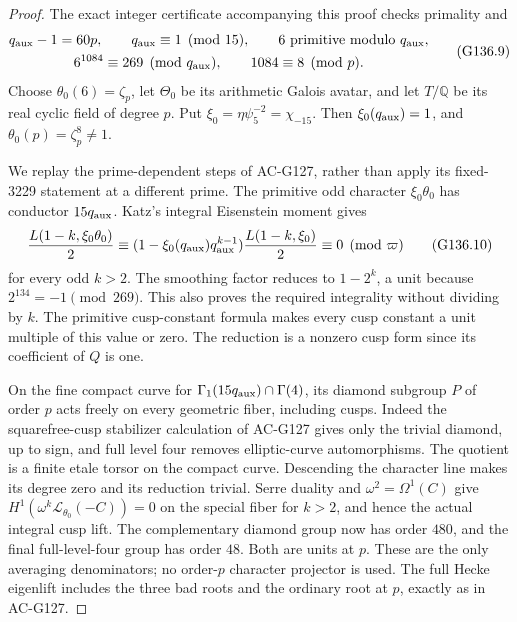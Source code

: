 \begin{proof}
The exact integer certificate accompanying this proof checks
primality and
\[
 \begin{gathered}
 q_{\rm aux}-1=60p,\qquad q_{\rm aux}\equiv1\pmod{15},\qquad
 6\text{ primitive modulo }q_{\rm aux},\\
 6^{1084}\equiv269\pmod{q_{\rm aux}},\qquad1084\equiv8\pmod p.
 \end{gathered}
 \tag{G136.9}
\]
Choose \(\theta_0(6)=\zeta_p\), let \(\Theta_0\) be its
arithmetic Galois avatar, and let \(T/\mathbb Q\) be its real
cyclic field of degree \(p\).  Put \(\xi_0=\eta\psi_5^{-2}
=\chi_{-15}\).  Then \(\xi_0(q_{\rm aux})=1\), and
\(\theta_0(p)=\zeta_p^8\ne1\).

We replay the prime-dependent steps of AC-G127, rather than
apply its fixed-3229 statement at a different prime.
The primitive odd character \(\xi_0\theta_0\) has conductor
\(15q_{\rm aux}\).  Katz's integral Eisenstein moment gives
\[
 \frac{L(1-k,\xi_0\theta_0)}2
 \equiv(1-\xi_0(q_{\rm aux})q_{\rm aux}^{k-1})
             \frac{L(1-k,\xi_0)}2\equiv0\pmod\varpi
 \tag{G136.10}
\]
for every odd \(k>2\).  The smoothing factor reduces to
\(1-2^k\), a unit because \(2^{134}=-1\pmod{269}\).
This also proves the required integrality without dividing by
\(k\).  The primitive cusp-constant formula makes every cusp
constant a unit multiple of this value or zero.  The reduction
is a nonzero cusp form since its coefficient of \(Q\) is one.

On the fine compact curve for
\(\Gamma_1(15q_{\rm aux})\cap\Gamma(4)\), its diamond
subgroup \(P\) of order \(p\) acts freely on every geometric
fiber, including cusps.  Indeed the squarefree-cusp stabilizer
calculation of AC-G127 gives only the trivial diamond, up to
sign, and full level four removes elliptic-curve automorphisms.
The quotient is a finite etale torsor on the compact curve.
Descending the character line makes its degree zero and its
reduction trivial.  Serre duality and
\(\omega^2=\Omega^1(C)\) give
\(H^1(\omega^k\mathcal L_{\theta_0}(-C))=0\) on the
special fiber for \(k>2\), and hence the actual integral cusp
lift.  The complementary diamond group now has order \(480\),
and the final full-level-four group has order \(48\).
Both are units at \(p\).  These are the only averaging
denominators; no order-\(p\) character projector is used.
The full Hecke eigenlift includes the three bad roots and the
ordinary root at \(p\), exactly as in AC-G127.


\end{proof}
